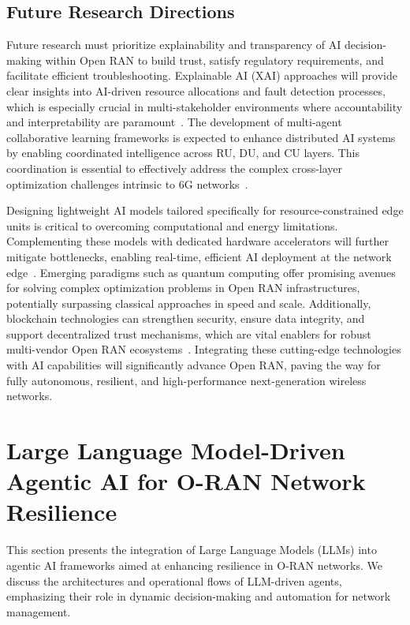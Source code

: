 \documentclass[sigconf]{acmart}
\begin{document}
\subsection{Future Research Directions}

Future research must prioritize explainability and transparency of AI decision-making within Open RAN to build trust, satisfy regulatory requirements, and facilitate efficient troubleshooting. Explainable AI (XAI) approaches will provide clear insights into AI-driven resource allocations and fault detection processes, which is especially crucial in multi-stakeholder environments where accountability and interpretability are paramount~\cite{ref54}. The development of multi-agent collaborative learning frameworks is expected to enhance distributed AI systems by enabling coordinated intelligence across RU, DU, and CU layers. This coordination is essential to effectively address the complex cross-layer optimization challenges intrinsic to 6G networks~\cite{ref48}.

Designing lightweight AI models tailored specifically for resource-constrained edge units is critical to overcoming computational and energy limitations. Complementing these models with dedicated hardware accelerators will further mitigate bottlenecks, enabling real-time, efficient AI deployment at the network edge~\cite{ref50}. Emerging paradigms such as quantum computing offer promising avenues for solving complex optimization problems in Open RAN infrastructures, potentially surpassing classical approaches in speed and scale. Additionally, blockchain technologies can strengthen security, ensure data integrity, and support decentralized trust mechanisms, which are vital enablers for robust multi-vendor Open RAN ecosystems~\cite{ref54}. Integrating these cutting-edge technologies with AI capabilities will significantly advance Open RAN, paving the way for fully autonomous, resilient, and high-performance next-generation wireless networks.

\section{Large Language Model-Driven Agentic AI for O-RAN Network Resilience}

This section presents the integration of Large Language Models (LLMs) into agentic AI frameworks aimed at enhancing resilience in O-RAN networks. We discuss the architectures and operational flows of LLM-driven agents, emphasizing their role in dynamic decision-making and automation for network management. 
\end{document}
